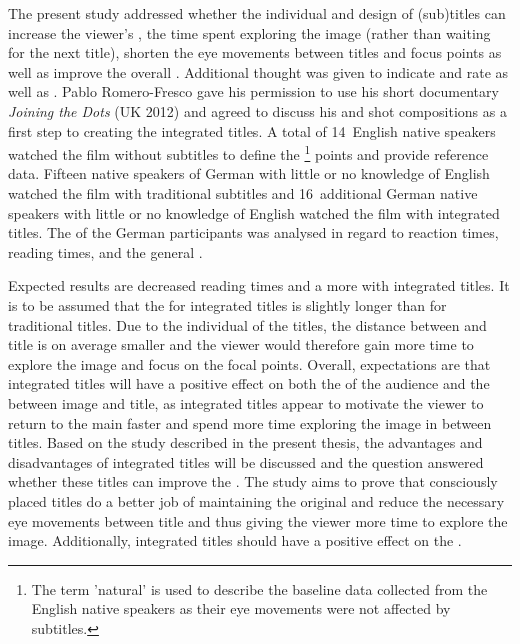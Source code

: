 The present  study addressed whether the individual  and design of (sub)titles can increase the viewer’s , the time spent exploring the image (rather than waiting for the next title), shorten the eye movements between titles and focus points as well as improve the overall . Additional thought was given to indicate  and rate as well as . Pablo Romero-Fresco gave his permission to use his short documentary \textit{Joining the Dots} (UK 2012) and agreed to discuss his  and shot compositions as a first step to creating the integrated titles. A total of 14~English native speakers watched the film without subtitles to define the \footnote{The term 'natural' is used to describe the baseline data collected from the English native speakers as their eye movements were not affected by subtitles.} points and provide reference data. Fifteen native speakers of German with little or no knowledge of English watched the film with traditional subtitles and 16~additional German native speakers with little or no knowledge of English watched the film with integrated titles. The  of the German participants was analysed in regard to reaction times, reading times, and the general .


\largerpage
Expected results are decreased reading times and a more  with integrated titles. It is to be assumed that the  for integrated titles is slightly longer than for traditional titles. Due to the individual  of the titles, the distance between  and title is on average smaller and the viewer would therefore gain more time to explore the image and focus on the focal points. Overall, expectations are that integrated titles will have a positive effect on both the   of the audience and the  between image and title, as integrated titles appear to motivate the viewer to return to the main  faster and spend more time exploring the image in between titles. Based on the study described in the present thesis, the advantages and disadvantages of integrated titles will be discussed and the question answered whether these titles can improve the . The study aims to prove that consciously placed titles do a better job of maintaining the original  and reduce the necessary eye movements between title and  thus giving the viewer more time to explore the image. Additionally, integrated titles should have a positive effect on the  .

